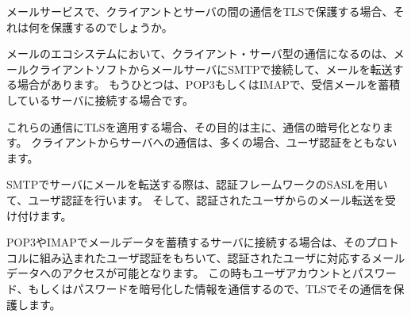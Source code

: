 メールサービスで、クライアントとサーバの間の通信をTLSで保護する場合、それは何を保護するのでしょうか。

メールのエコシステムにおいて、クライアント・サーバ型の通信になるのは、メールクライアントソフトからメールサーバにSMTPで接続して、メールを転送する場合があります。
もうひとつは、POP3もしくはIMAPで、受信メールを蓄積しているサーバに接続する場合です。

これらの通信にTLSを適用する場合、その目的は主に、通信の暗号化となります。
クライアントからサーバへの通信は、多くの場合、ユーザ認証をともないます。

SMTPでサーバにメールを転送する際は、認証フレームワークのSASLを用いて、ユーザ認証を行います。
そして、認証されたユーザからのメール転送を受け付けます。

POP3やIMAPでメールデータを蓄積するサーバに接続する場合は、そのプロトコルに組み込まれたユーザ認証をもちいて、認証されたユーザに対応するメールデータへのアクセスが可能となります。
この時もユーザアカウントとパスワード、もしくはパスワードを暗号化した情報を通信するので、TLSでその通信を保護します。


